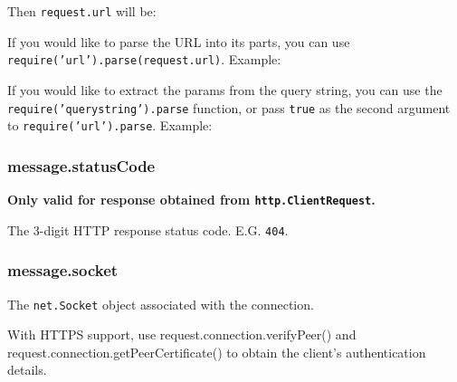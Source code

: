Then \texttt{request.url} will be:

\begin{Shaded}
\begin{Highlighting}[]
\end{Highlighting}
\end{Shaded}

If you would like to parse the URL into its parts, you can use
\texttt{require('url').parse(request.url)}. Example:

\begin{Shaded}
\begin{Highlighting}[]
\NormalTok{(}\NormalTok{)}
\NormalTok{\{ }\NormalTok{: }\NormalTok{,}
  \NormalTok{: }\NormalTok{,}
  \NormalTok{: }\NormalTok{,}
  \NormalTok{: } \NormalTok{\}}
\end{Highlighting}
\end{Shaded}

If you would like to extract the params from the query string, you can
use the \texttt{require('querystring').parse} function, or pass
\texttt{true} as the second argument to \texttt{require('url').parse}.
Example:

\begin{Shaded}
\begin{Highlighting}[]
\NormalTok{(}\NormalTok{, }\NormalTok{)}
\NormalTok{\{ }\NormalTok{: }\NormalTok{,}
  \NormalTok{: }\NormalTok{,}
  \NormalTok{: \{ }\NormalTok{: } \NormalTok{\},}
  \NormalTok{: } \NormalTok{\}}
\end{Highlighting}
\end{Shaded}

\subsubsection{message.statusCode}

\textbf{Only valid for response obtained from
\texttt{http.ClientRequest}.}

The 3-digit HTTP response status code. E.G. \texttt{404}.

\subsubsection{message.socket}

The \texttt{net.Socket} object associated with the connection.

With HTTPS support, use request.connection.verifyPeer() and
request.connection.getPeerCertificate() to obtain the client's
authentication details.

